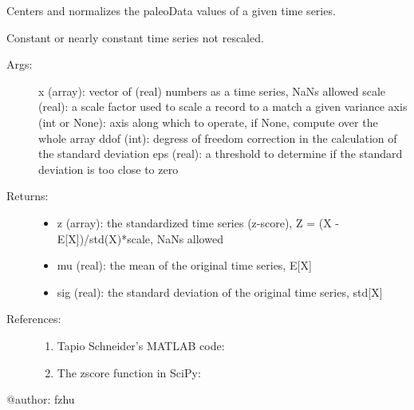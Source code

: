 \documentclass[letterpaper,10pt,english]{sphinxmanual}
\begin{document}
\begin{fulllineitems}
\label{\detokenize{Main:pyleoclim.standardizeTs}}
Centers and normalizes the paleoData values of a  given time series.

Constant or nearly constant time series not rescaled.
\begin{description}
\item[{Args:}] \leavevmode
x (array): vector of (real) numbers as a time series, NaNs allowed
scale (real): a scale factor used to scale a record to a match a given variance
axis (int or None): axis along which to operate, if None, compute over the whole array
ddof (int): degress of freedom correction in the calculation of the standard deviation
eps (real): a threshold to determine if the standard deviation is too close to zero

\item[{Returns:}] \leavevmode\begin{itemize}
\item {} 
z (array): the standardized time series (z-score), Z = (X - E{[}X{]})/std(X)*scale, NaNs allowed

\item {} 
mu (real): the mean of the original time series, E{[}X{]}

\item {} 
sig (real): the standard deviation of the original time series, std{[}X{]}

\end{itemize}

\item[{References:}] \leavevmode\begin{enumerate}
\item {} 
Tapio Schneider’s MATLAB code: 

\item {} 
The zscore function in SciPy: 

\end{enumerate}

\end{description}

@author: fzhu

\end{fulllineitems}
\end{document}
